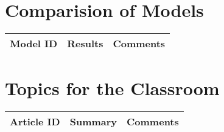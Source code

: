 \section{Comparision of Models}

\begin{table}[H]\centering
	\begin{tabular}{p{1cm}p{4cm}p{3cm}}
		Model ID & Results & Comments\\
		\hline
		\hline
	\end{tabular}
\end{table}

\section{Topics for the Classroom}

\begin{table}[H]\centering
	\begin{tabular}{p{1cm}p{4cm}p{3cm}}
		Article ID & Summary & Comments\\
		\hline
		\hline
	\end{tabular}
\end{table}

